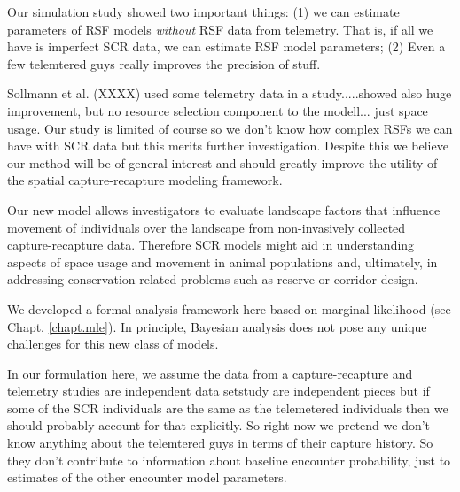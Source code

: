 Our simulation study showed two important things:
(1) we can estimate parameters of RSF models {\it without} RSF data
from telemetry. That is, if all we have is imperfect SCR data, we can
estimate RSF model parameters;
(2) Even a few telemtered guys really
improves the precision of stuff.

Sollmann et al. (XXXX) used some telemetry data in a study.....showed
also huge improvement, but no resource selection component to the
modell... just space usage.
Our study is limited of course so we don't know how complex RSFs we
can have with SCR data but this merits further investigation. Despite
this we believe our method will be of general interest and should
greatly improve the utility of the spatial capture-recapture modeling
framework.


Our new model allows investigators to evaluate landscape factors that
influence movement of individuals over the landscape from
non-invasively collected capture-recapture data.  Therefore SCR models
might aid in understanding aspects of space usage and movement in
animal populations and, ultimately, in addressing conservation-related
problems such as reserve or corridor design.

We developed a formal analysis framework here based on 
marginal likelihood \citep{borchers_efford:2008}
(see Chapt. \ref{chapt.mle}).
In principle,
Bayesian analysis does not pose any unique challenges for this new
class of models.

In our formulation here, 
we assume the data from a capture-recapture and telemetry studies are
independent data setstudy 
are independent pieces but if some of the SCR
individuals are the same as the telemetered individuals then we should
probably account for that explicitly. So right now we pretend we don't
know anything about the telemtered guys in terms of their capture
history. So they don't contribute to information about baseline
encounter probability, just to estimates of the other encounter model
parameters. 

























